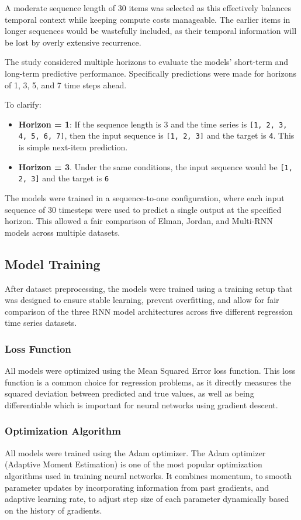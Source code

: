 \documentclass[conference]{IEEEtran}
\begin{document}
A moderate sequence length of 30 items was selected as this effectively balances temporal context while keeping compute costs manageable. The earlier items in longer sequences would be wastefully included, as their temporal information will be lost by overly extensive recurrence.

The study considered multiple horizons to evaluate the models' short-term and long-term predictive performance. Specifically predictions were made for horizons of 1, 3, 5, and 7 time steps ahead.

To clarify:
\begin{itemize}
    \item \textbf{Horizon = 1}: If the sequence length is 3 and the time series is \texttt{[1, 2, 3, 4, 5, 6, 7]}, then the input sequence is \texttt{[1, 2, 3]} and the target is \texttt{4}. This is simple next-item prediction.
    \item \textbf{Horizon = 3}. Under the same conditions, the input sequence would be \texttt{[1, 2, 3]} and the target is \texttt{6}
\end{itemize}
The models were trained in a sequence-to-one configuration, where each input sequence of 30 timesteps were used to predict a single output at the specified horizon. This allowed a fair comparison of Elman, Jordan, and Multi-RNN models across multiple datasets.

\subsection{\textbf{Model Training}}
After dataset preprocessing, the models were trained using a training setup that was designed to ensure stable learning, prevent overfitting, and allow for fair comparison of the three RNN model architectures across five different regression time series datasets.

\subsubsection{\textbf{Loss Function}}
All models were optimized using the Mean Squared Error loss function. This loss function is a common choice for regression problems, as it directly measures the squared deviation between predicted and true values, as well as being differentiable which is important for neural networks using gradient descent.

\subsubsection{\textbf{Optimization Algorithm}}
All models were trained using the Adam optimizer. The Adam optimizer (Adaptive Moment Estimation) is one of the most popular optimization algorithms used in training neural networks. It combines momentum, to smooth parameter updates by incorporating information from past gradients, and adaptive learning rate, to adjust step size of each parameter dynamically based on the history of gradients.
\end{document}
